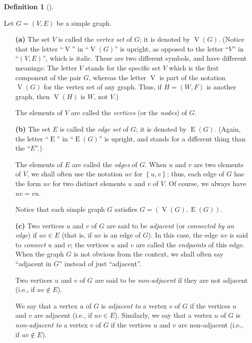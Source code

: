 \documentclass[numbers=enddot,12pt,final,onecolumn,notitlepage]{scrartcl}%
\theoremstyle{definition}
\newtheorem{defi}[theo]{Definition}
\newenvironment{definition}[1][]
{\begin{defi}[#1]\begin{leftbar}}
{\end{leftbar}\end{defi}}
\newcommand{\set}[1]{\left\{ #1 \right\}}
\newcommand{\tup}[1]{\left( #1 \right)}
\newcommand{\verts}[1]{\operatorname{V}\left( #1 \right)}
\newcommand{\edges}[1]{\operatorname{E}\left( #1 \right)}
\begin{document}
\begin{definition} \label{def.intro.simple.VE}
Let $G = \tup{V, E}$ be a simple graph.

\begin{enumerate}

\item[\textbf{(a)}]
The set $V$ is called the \textit{vertex set} of $G$;
it is denoted by $\verts{G}$. (Notice that the letter
``$\operatorname{V}$'' in ``$\verts{G}$'' is upright, as opposed to
the letter ``$V$'' in ``$\tup{V, E}$'', which is italic.
These are two different symbols, and have different meanings: The
letter $V$ stands for the specific set $V$ which is the first
component of the pair $G$, whereas the letter
$\operatorname{V}$ is part of the notation $\verts{G}$ for the
vertex set of any graph. Thus, if $H = \left(W, F\right)$ is another
graph, then $\verts{H}$ is $W$, not $V$.)

The elements of $V$ are called the \textit{vertices} (or the
\textit{nodes}) of $G$.

\item[\textbf{(b)}]
The set $E$ is called the \textit{edge set} of $G$; it
is denoted by $\edges{G}$. (Again, the letter ``$\operatorname{E}$''
in ``$\edges{G}$'' is upright, and stands for a different thing than
the ``$E$''.)

The elements of $E$ are called the \textit{edges} of $G$. When $u$ and
$v$ are two elements of $V$, we shall often use the notation $uv$ for
$\set{u, v}$; thus, each edge of $G$ has the form $uv$ for two
distinct elements $u$ and $v$ of $V$. Of course, we always have
$uv = vu$.

Notice that each simple graph $G$ satisfies
$G = \tup{\verts{G}, \edges{G}}$.

\item[\textbf{(c)}] Two vertices $u$ and $v$ of $G$ are said to be
\textit{adjacent} (or \textit{connected by an edge}) if $uv \in E$
(that is, if $uv$ is an edge of $G$). In this case, the edge $uv$ is
said to \textit{connect} $u$ and $v$; the vertices $u$ and $v$ are
called the \textit{endpoints} of this edge. When the graph $G$ is not
obvious from the context, we shall often say ``adjacent in $G$''
instead of just ``adjacent''.

Two vertices $u$ and $v$ of $G$
are said to be \textit{non-adjacent} if they are not adjacent (i.e.,
if $uv \notin E$).

We say that a vertex $u$ of $G$ is \textit{adjacent to} a vertex $v$
of $G$ if the vertices $u$ and $v$ are adjacent (i.e., if $uv \in E$).
Similarly, we say that a vertex $u$ of $G$ is \textit{non-adjacent to}
a vertex $v$ of $G$ if the vertices $u$ and $v$ are non-adjacent
(i.e., if $uv \notin E$).


\end{enumerate}
\end{definition}
\end{document}
